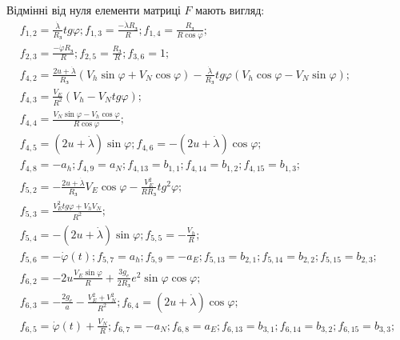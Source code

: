 Відмінні від нуля елементи матриці $F$ мають вигляд:
\begin{equation} 
\begin{array}{l}
\label{eq:Fsdins_} 
{f_{1,2} =\frac{\dot{\lambda }}{R_{\text{З}} } tg\varphi;f_{1,3} =\frac{-\dot{\lambda }R_{\text{З}} }{R};f_{1,4} =\frac{R_{\text{З}} }{R\cos \varphi } ;}\\
{f_{2,3} =\frac{-\dot{\varphi }R_{\text{З}} }{R};f_{2,5} =\frac{R_{\text{З}} }{R};f_{3,6} =1;}\\
{f_{4,2} =\frac{2u+\dot{\lambda }}{R_{\text{З}} } \left(V_{h} \sin \varphi +V_{N} \cos \varphi \right)-\frac{\dot{\lambda }}{R_{\text{З}} } tg\varphi \left(V_{h} \cos \varphi -V_{N} \sin \varphi \right);}\\
{f_{4,3}=\frac{V_{E} }{R^{2} } \left(V_{h} -V_{N} tg\varphi \right);}\\
{f_{4,4}=\frac{V_{N}\sin \varphi -V_{h} \cos \varphi }{R\cos \varphi } ;}\\
{f_{4,5}=\left(2u+\dot{\lambda }\right)\sin \varphi; f_{4,6}=-\left(2u+\dot{\lambda }\right)\cos \varphi ;}\\
{f_{4,8}=-a_{h};f_{4,9}=a_{N};f_{4,13}=b_{1,1};f_{4,14}=b_{1,2};f_{4,15}=b_{1,3};}\\
{f_{5,2}=-\frac{2u+\dot{\lambda }}{R_{\text{З}} }V_{E} \cos \varphi -\frac{V_{E}^{2} }{RR_{\text{З}} } tg^{2} \varphi ;}\\
{f_{5,3}=\frac{V_{E}^{2} tg\varphi +V_{h} V_{N} }{R^{2} } ;}\\ 
{f_{5,4}=-\left(2u+\dot{\lambda }\right)\sin \varphi;f_{5,5}=-\frac{V_{h} }{R};}\\
{f_{5,6}=-\dot{\varphi }(t);f_{5,7}=a_{h}; f_{5,9} =-a_{E};f_{5,13}=b_{2,1};f_{5,14}=b_{2,2};f_{5,15}=b_{2,3} ;}\\
{f_{6,2} =-2u\frac{V_{E}^{} \sin \varphi }{R} +\frac{3g_{e} }{2R_{\text{З}}} e^{2} \sin \varphi \cos \varphi ;}\\
{f_{6,3} =-\frac{2g_{e} }{a} -\frac{V_{E}^{2} +V_{N}^{2}}{R^{2} };f_{6,4} =\left(2u+\dot{\lambda }\right)\cos \varphi ;}\\
{f_{6,5}=\dot{\varphi }(t)+\frac{V_{N} }{R};f_{6,7} =-a_{N} ;f_{6,8} =a_{E} ;f_{6,13}=b_{3,1};f_{6,14}=b_{3,2}; f_{6,15}=b_{3,3} ;}\\ 

\end{array}
\end{equation}
